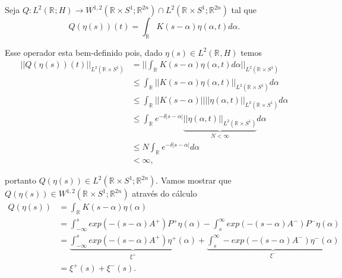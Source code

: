 \documentclass[12pt]{book}
\newcommand{\circulo}{S^{1}}
\newcommand{\espacoLdois}[1]{L^{2}(#1)}
\newcommand{\espacosobolevgeral}[2]{W^{1,#1}(#2)}
\newcommand{\norma}[1]{||#1||}
\newcommand{\normagrande}[1]{\Big|\Big|#1\Big|\Big|}
\newcommand{\retacartesianocirculo}{\real{} \times \circulo}
\newcommand{\real}[1]{\mathbb{R}^{#1}}
\newcommand{\reta}{\real{}}
\begin{document}
	Seja $Q: \espacoLdois{\real{};H} \to \espacosobolevgeral{2}{\retacartesianocirculo;\real{2n}} \cap \espacoLdois{\retacartesianocirculo;\real{2n}}$ tal que 
	$$
		Q(\eta(s))(t) = \int_{\real{}}K(s-\alpha)\eta(\alpha, t)d\alpha.
	$$
	
	Esse operador esta bem-definido pois, dado $\eta(s) \in \espacoLdois{\reta, H}$ temos
	$$
	\begin{aligned}
		\norma{Q(\eta(s))(t)}_{\espacoLdois{\retacartesianocirculo}} &= \normagrande{\int_{\real{}}K(s-\alpha)\eta(\alpha, t)d\alpha}_{\espacoLdois{\retacartesianocirculo}}
		\\
		&\leq
		\int_{\reta}\norma{K(s-\alpha)\eta(\alpha, t)}_{\espacoLdois{\retacartesianocirculo}}d\alpha
		\\
		&\leq
		\int_{\reta}\norma{K(s-\alpha)}\norma{\eta(\alpha, t)}_{\espacoLdois{\retacartesianocirculo}}d\alpha
		\\
		&\leq
		\int_{\reta}e^{-\delta|s-\alpha|}  \underbrace{\norma{\eta(\alpha, t)}_{\espacoLdois{\retacartesianocirculo}}}_{N < \infty}d\alpha
		\\
		&\leq
		N\int_{\reta}e^{-\delta|s-\alpha|} d\alpha
		\\
		&< \infty,	
	\end{aligned}
	$$
	
	portanto $Q(\eta(s)) \in \espacoLdois{\retacartesianocirculo;\real{2n}}$. Vamos mostrar que $Q(\eta(s)) \in \espacosobolevgeral{2}{\retacartesianocirculo;\real{2n}}$ através do cálculo
	$$
	\begin{aligned}
		Q(\eta(s)) 
		&= \int_{\reta}K(s-\alpha)\eta(\alpha)
		\\
		&=\int_{-\infty}^{s}exp(-(s-\alpha)A^{+})P^{+}\eta(\alpha)-\int_{s}^{\infty}exp(-(s-\alpha)A^{-})P^{-}\eta(\alpha)
		\\
		&=\underbrace{\int_{-\infty}^{s}exp(-(s-\alpha)A^{+})\eta^{+}(\alpha)}_{\xi^{+}} +\underbrace{\int_{s}^{\infty}-exp(-(s-\alpha)A^{-})\eta^{-}(\alpha)}_{\xi^{-}}
		\\
		&= \xi^{+}(s)+\xi^{-}(s).
	\end{aligned}
	$$
	
\end{document}
